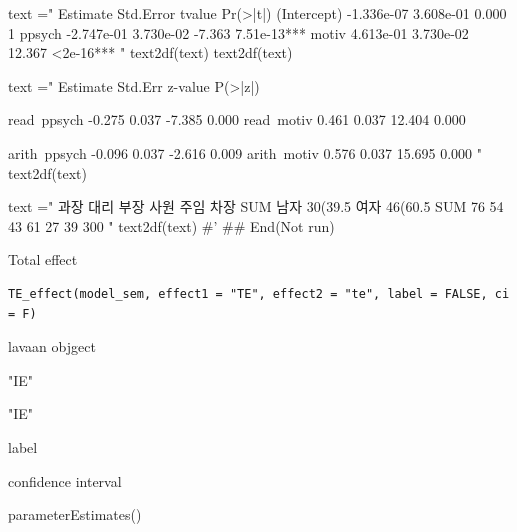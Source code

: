 \documentclass[a4paper]{book}
\begin{document}
\begin{Examples}
\begin{ExampleCode}
text ="             Estimate Std.Error tvalue Pr(>|t|)
(Intercept) -1.336e-07  3.608e-01   0.000        1
ppsych      -2.747e-01  3.730e-02  -7.363  7.51e-13***
motiv        4.613e-01  3.730e-02  12.367  <2e-16***
"
text2df(text) %
text2df(text) %


text ="                   Estimate  Std.Err  z-value  P(>|z|)

    read~ppsych           -0.275    0.037   -7.385    0.000
    read~motiv             0.461    0.037   12.404    0.000

    arith~ppsych           -0.096    0.037   -2.616    0.009
     arith~motiv             0.576    0.037   15.695    0.000
"
text2df(text)



text =" 과장 대리 부장 사원 주임 차장 SUM
남자 30(39.5%
여자 46(60.5%
SUM 76 54 43 61 27 39 300
"
text2df(text)
#' 
## End(Not run)

\end{ExampleCode}
\end{Examples}
%
\begin{Description}
Total effect
\end{Description}
%
\begin{Usage}
\begin{verbatim}
TE_effect(model_sem, effect1 = "TE", effect2 = "te", label = FALSE, ci = F)
\end{verbatim}
\end{Usage}
%
\begin{Arguments}
\begin{ldescription}
\item[\code{model\_sem}] lavaan objgect

\item[\code{effect1}] "IE"

\item[\code{effect2}] "IE"

\item[\code{label}] label

\item[\code{ci}] confidence interval
\end{ldescription}
\end{Arguments}
%
\begin{Value}
parameterEstimates()
\end{Value}
%
\end{document}

